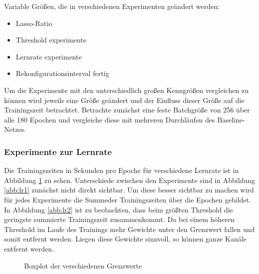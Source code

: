 Variable Größen, die in verschiedenen Experimenten geändert werden:

\begin{itemize}
 \item Lasso-Ratio
 \item Threshold experimente
 \item Lernrate experimente
 \item Rekonfigurationsinterval fertig
\end{itemize}

Um die Experimente mit den unterschiedlich großen Kenngrößen vergleichen zu können wird jeweils eine Größe geändert und der Einfluss dieser Größe auf die Trainingszeit betrachtet. Betrachte zunächst eine feste Batchgröße von 256 über alle 180 Epochen und vergleiche diese mit mehreren Durchläufen des Baseline-Netzes. 



\subsubsection{Experimente zur Lernrate}

Die Trainingszeiten in Sekunden pro Epoche für verschiedene Lernrate ist in Abbildung \ref{abb:lr} zu sehen. Unterschiede zwischen den Experimente sind in Abbildung \ref{abb:lr1} zunächst nicht direkt sichtbar. Um diese besser sichtbar zu machen wird für jedes Experimente die Summeder Trainingszeiten über die Epochen gebildet. In Abbildung \ref{abb:lr2} ist zu beobachten, dass beim größten Threshold die geringste summierte Trainingszeit zusammenkommt. Da bei einem höheren Threshold im Laufe des Trainings mehr Gewichte unter den Grenzwert fallen und somit entfernt werden. Liegen diese Gewichte sinnvoll, so können ganze Kanäle entfernt werden.
 \begin{figure}[h]
 \centering
 \qquad
 \caption{Boxplot der verschiedenen Grenzwerte}
 \label{abb:lr}
\end{figure}
 
